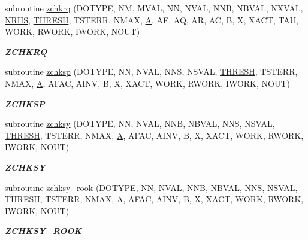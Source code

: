 \begin{DoxyCompactItemize}
subroutine \hyperlink{group__complex16__lin_ga628a31ab2d25e506913cc63aa51abb08}{zchkrq} (D\+O\+T\+Y\+P\+E, N\+M, M\+V\+A\+L, N\+N, N\+V\+A\+L, N\+N\+B, N\+B\+V\+A\+L, N\+X\+V\+A\+L, \hyperlink{example__user_8c_aa0138da002ce2a90360df2f521eb3198}{N\+R\+H\+S}, \hyperlink{zlaqgs_8c_a0656018abfc9fa2821827415f5d5ea57}{T\+H\+R\+E\+S\+H}, T\+S\+T\+E\+R\+R, N\+M\+A\+X, \hyperlink{classA}{A}, A\+F, A\+Q, A\+R, A\+C, B, X, X\+A\+C\+T, T\+A\+U, W\+O\+R\+K, R\+W\+O\+R\+K, I\+W\+O\+R\+K, N\+O\+U\+T)
\begin{DoxyCompactList}\small\item\em {\bfseries Z\+C\+H\+K\+R\+Q} \end{DoxyCompactList}\item 
subroutine \hyperlink{group__complex16__lin_gadd50cbdefe6f6f6f07278982845becbe}{zchksp} (D\+O\+T\+Y\+P\+E, N\+N, N\+V\+A\+L, N\+N\+S, N\+S\+V\+A\+L, \hyperlink{zlaqgs_8c_a0656018abfc9fa2821827415f5d5ea57}{T\+H\+R\+E\+S\+H}, T\+S\+T\+E\+R\+R, N\+M\+A\+X, \hyperlink{classA}{A}, A\+F\+A\+C, A\+I\+N\+V, B, X, X\+A\+C\+T, W\+O\+R\+K, R\+W\+O\+R\+K, I\+W\+O\+R\+K, N\+O\+U\+T)
\begin{DoxyCompactList}\small\item\em {\bfseries Z\+C\+H\+K\+S\+P} \end{DoxyCompactList}\item 
subroutine \hyperlink{group__complex16__lin_gabbc1a27f72fa2ad45d3bf6e697c0d9a8}{zchksy} (D\+O\+T\+Y\+P\+E, N\+N, N\+V\+A\+L, N\+N\+B, N\+B\+V\+A\+L, N\+N\+S, N\+S\+V\+A\+L, \hyperlink{zlaqgs_8c_a0656018abfc9fa2821827415f5d5ea57}{T\+H\+R\+E\+S\+H}, T\+S\+T\+E\+R\+R, N\+M\+A\+X, \hyperlink{classA}{A}, A\+F\+A\+C, A\+I\+N\+V, B, X, X\+A\+C\+T, W\+O\+R\+K, R\+W\+O\+R\+K, I\+W\+O\+R\+K, N\+O\+U\+T)
\begin{DoxyCompactList}\small\item\em {\bfseries Z\+C\+H\+K\+S\+Y} \end{DoxyCompactList}\item 
subroutine \hyperlink{group__complex16__lin_ga7d09ef6de3d877e915ca3eb2cfc351ef}{zchksy\+\_\+rook} (D\+O\+T\+Y\+P\+E, N\+N, N\+V\+A\+L, N\+N\+B, N\+B\+V\+A\+L, N\+N\+S, N\+S\+V\+A\+L, \hyperlink{zlaqgs_8c_a0656018abfc9fa2821827415f5d5ea57}{T\+H\+R\+E\+S\+H}, T\+S\+T\+E\+R\+R, N\+M\+A\+X, \hyperlink{classA}{A}, A\+F\+A\+C, A\+I\+N\+V, B, X, X\+A\+C\+T, W\+O\+R\+K, R\+W\+O\+R\+K, I\+W\+O\+R\+K, N\+O\+U\+T)
\begin{DoxyCompactList}\small\item\em {\bfseries Z\+C\+H\+K\+S\+Y\+\_\+\+R\+O\+O\+K} \end{DoxyCompactList}\item 

\end{DoxyCompactItemize}
